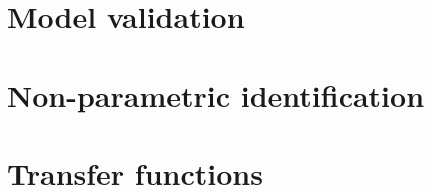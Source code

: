 \documentclass[12pt, a4paper]{report}
\begin{document}
    \chapter{Model validation}
    
    

    \chapter{Non-parametric identification}
    
    
    
    
    

    \appendix
    \chapter{Transfer functions}
    
    
    
\end{document}
